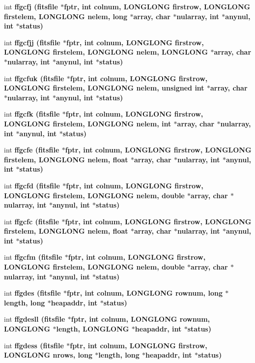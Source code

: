 \begin{CompactItemize}
\item 
int \bf{ffgcfj} (\bf{fitsfile} $\ast$fptr, int colnum, \bf{LONGLONG} firstrow, \bf{LONGLONG} firstelem, \bf{LONGLONG} nelem, long $\ast$array, char $\ast$nularray, int $\ast$anynul, int $\ast$status)
\item 
int \bf{ffgcfjj} (\bf{fitsfile} $\ast$fptr, int colnum, \bf{LONGLONG} firstrow, \bf{LONGLONG} firstelem, \bf{LONGLONG} nelem, \bf{LONGLONG} $\ast$array, char $\ast$nularray, int $\ast$anynul, int $\ast$status)
\item 
int \bf{ffgcfuk} (\bf{fitsfile} $\ast$fptr, int colnum, \bf{LONGLONG} firstrow, \bf{LONGLONG} firstelem, \bf{LONGLONG} nelem, unsigned int $\ast$array, char $\ast$nularray, int $\ast$anynul, int $\ast$status)
\item 
int \bf{ffgcfk} (\bf{fitsfile} $\ast$fptr, int colnum, \bf{LONGLONG} firstrow, \bf{LONGLONG} firstelem, \bf{LONGLONG} nelem, int $\ast$array, char $\ast$nularray, int $\ast$anynul, int $\ast$status)
\item 
int \bf{ffgcfe} (\bf{fitsfile} $\ast$fptr, int colnum, \bf{LONGLONG} firstrow, \bf{LONGLONG} firstelem, \bf{LONGLONG} nelem, float $\ast$array, char $\ast$nularray, int $\ast$anynul, int $\ast$status)
\item 
int \bf{ffgcfd} (\bf{fitsfile} $\ast$fptr, int colnum, \bf{LONGLONG} firstrow, \bf{LONGLONG} firstelem, \bf{LONGLONG} nelem, double $\ast$array, char $\ast$nularray, int $\ast$anynul, int $\ast$status)
\item 
int \bf{ffgcfc} (\bf{fitsfile} $\ast$fptr, int colnum, \bf{LONGLONG} firstrow, \bf{LONGLONG} firstelem, \bf{LONGLONG} nelem, float $\ast$array, char $\ast$nularray, int $\ast$anynul, int $\ast$status)
\item 
int \bf{ffgcfm} (\bf{fitsfile} $\ast$fptr, int colnum, \bf{LONGLONG} firstrow, \bf{LONGLONG} firstelem, \bf{LONGLONG} nelem, double $\ast$array, char $\ast$nularray, int $\ast$anynul, int $\ast$status)
\item 
int \bf{ffgdes} (\bf{fitsfile} $\ast$fptr, int colnum, \bf{LONGLONG} rownum, long $\ast$length, long $\ast$heapaddr, int $\ast$status)
\item 
int \bf{ffgdesll} (\bf{fitsfile} $\ast$fptr, int colnum, \bf{LONGLONG} rownum, \bf{LONGLONG} $\ast$length, \bf{LONGLONG} $\ast$heapaddr, int $\ast$status)
\item 
int \bf{ffgdess} (\bf{fitsfile} $\ast$fptr, int colnum, \bf{LONGLONG} firstrow, \bf{LONGLONG} nrows, long $\ast$length, long $\ast$heapaddr, int $\ast$status)
\item 

\end{CompactItemize}

